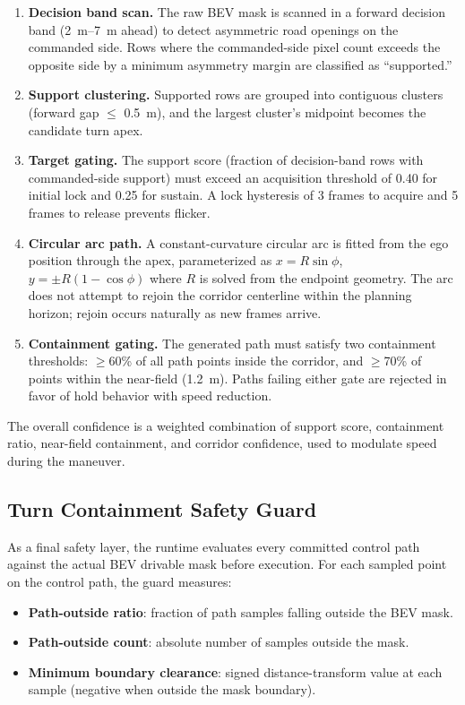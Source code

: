 \documentclass[12pt,letterpaper,oneside]{report}
\begin{document}
\begin{enumerate}[nosep]
  \item \textbf{Decision band scan.} The raw BEV mask is scanned in a forward decision band (\SIrange{2}{7}{m} ahead) to detect asymmetric road openings on the commanded side. Rows where the commanded-side pixel count exceeds the opposite side by a minimum asymmetry margin are classified as ``supported.''
  \item \textbf{Support clustering.} Supported rows are grouped into contiguous clusters (forward gap $\leq$ \SI{0.5}{m}), and the largest cluster's midpoint becomes the candidate turn apex.
  \item \textbf{Target gating.} The support score (fraction of decision-band rows with commanded-side support) must exceed an acquisition threshold of 0.40 for initial lock and 0.25 for sustain. A lock hysteresis of 3 frames to acquire and 5 frames to release prevents flicker.
  \item \textbf{Circular arc path.} A constant-curvature circular arc is fitted from the ego position through the apex, parameterized as $x = R\sin\phi$, $y = \pm R(1-\cos\phi)$ where $R$ is solved from the endpoint geometry. The arc does not attempt to rejoin the corridor centerline within the planning horizon; rejoin occurs naturally as new frames arrive.
  \item \textbf{Containment gating.} The generated path must satisfy two containment thresholds: $\geq$60\% of all path points inside the corridor, and $\geq$70\% of points within the near-field (\SI{1.2}{m}). Paths failing either gate are rejected in favor of hold behavior with speed reduction.
\end{enumerate}

The overall confidence is a weighted combination of support score, containment ratio, near-field containment, and corridor confidence, used to modulate speed during the maneuver.


\subsection{Turn Containment Safety Guard}
\label{sec:turn_containment_method}

As a final safety layer, the runtime evaluates every committed control path against the actual BEV drivable mask before execution. For each sampled point on the control path, the guard measures:

\begin{itemize}[nosep]
  \item \textbf{Path-outside ratio}: fraction of path samples falling outside the BEV mask.
  \item \textbf{Path-outside count}: absolute number of samples outside the mask.
  \item \textbf{Minimum boundary clearance}: signed distance-transform value at each sample (negative when outside the mask boundary).
\end{itemize}
\end{document}
